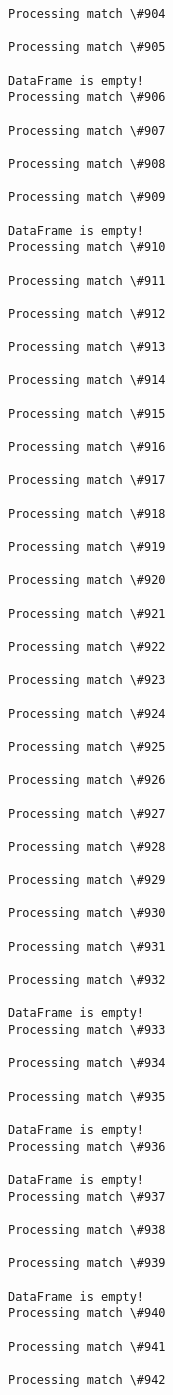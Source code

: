 \documentclass[11pt]{article}
\begin{document}
\begin{Verbatim}[commandchars=\\\{\}]
Processing match \#904

Processing match \#905

DataFrame is empty!
Processing match \#906

Processing match \#907

Processing match \#908

Processing match \#909

DataFrame is empty!
Processing match \#910

Processing match \#911

Processing match \#912

Processing match \#913

Processing match \#914

Processing match \#915

Processing match \#916

Processing match \#917

Processing match \#918

Processing match \#919

Processing match \#920

Processing match \#921

Processing match \#922

Processing match \#923

Processing match \#924

Processing match \#925

Processing match \#926

Processing match \#927

Processing match \#928

Processing match \#929

Processing match \#930

Processing match \#931

Processing match \#932

DataFrame is empty!
Processing match \#933

Processing match \#934

Processing match \#935

DataFrame is empty!
Processing match \#936

DataFrame is empty!
Processing match \#937

Processing match \#938

Processing match \#939

DataFrame is empty!
Processing match \#940

Processing match \#941

Processing match \#942


\end{Verbatim}
\end{document}
